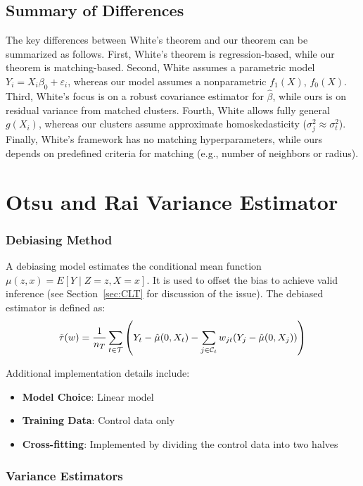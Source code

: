 \documentclass{mytemplate}
\begin{document}
\subsection{Summary of Differences}

The key differences between White's theorem and our theorem can be summarized as follows. First, White's theorem is regression-based, while our theorem is matching-based. Second, White assumes a parametric model \(Y_i = X_i \beta_0 + \varepsilon_i\), whereas our model assumes a nonparametric \(f_1(X)\), \(f_0(X)\). Third, White's focus is on a robust covariance estimator for \(\hat{\beta}\), while ours is on residual variance from matched clusters. Fourth, White allows fully general \(g(X_i)\), whereas our clusters assume approximate homoskedasticity (\(\sigma_j^2 \approx \sigma_t^2\)). Finally, White's framework has no matching hyperparameters, while ours depends on predefined criteria for matching (e.g., number of neighbors or radius).



\section{Otsu and Rai Variance Estimator}
\subsubsection{Debiasing Method}
A debiasing model estimates the conditional mean function $\mu(z, x) = E[Y \mid Z=z, X=x]$. It is used to offset the bias to achieve valid inference (see Section~\ref{sec:CLT} for discussion of the issue). The debiased estimator is defined as:
\begin{equation}
\Tilde{\tau}(w) = \frac{1}{n_T} \sum_{t \in \mathcal{T}} \left(Y_t - \hat \mu(0, X_t) - \sum_{j \in \mathcal{C}_t} w_{jt} ( Y_j - \hat\mu(0, X_j) ) \right)
\end{equation}

Additional implementation details include:
\begin{itemize}
\item \textbf{Model Choice}: Linear model
\item \textbf{Training Data}: Control data only
\item \textbf{Cross-fitting}: Implemented by dividing the control data into two halves
\end{itemize}

\subsubsection{Variance Estimators}
\end{document}
